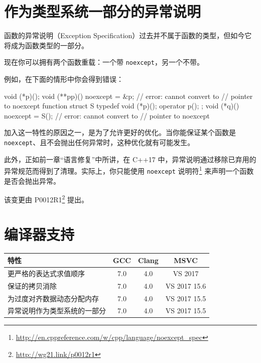 \section{作为类型系统一部分的异常说明}

函数的异常说明（Exception Specification）过去并不属于函数的类型，但如今它将成为函数类型的一部分。

现在你可以拥有两个函数重载：一个带 \texttt{noexcept}，另一个不带。

例如，在下面的情形中你会得到错误：

\begin{codebox}[cpp]
void (*p)();
void (**pp)() noexcept = &p; // error: cannot convert to
// pointer to noexcept function
struct S { typedef void (*p)(); operator p(); };
void (*q)() noexcept = S(); // error: cannot convert to
// pointer to noexcept
\end{codebox}

加入这一特性的原因之一，是为了允许更好的优化。当你能保证某个函数是 \texttt{noexcept}、且不会抛出任何异常时，这种优化就有可能发生。

此外，正如前一章“语言修复”中所讲，在 C++17 中，异常说明通过移除已弃用的异常规范而得到了清理。实际上，你只能使用 \texttt{noexcept} 说明符\footnote{\url{http://en.cppreference.com/w/cpp/language/noexcept_spec}} 来声明一个函数是否会抛出异常。

\begin{myInfoBox}
该变更由 P0012R1\footnote{\url{http://wg21.link/p0012r1}} 提出。
\end{myInfoBox}

\section{编译器支持}

\begin{table}[H]
\centering
\begin{tabularx}{\textwidth}{X c c c}
\toprule
特性 & GCC & Clang & MSVC \\
\midrule
更严格的表达式求值顺序 & 7.0 & 4.0 & VS 2017 \\
保证的拷贝消除 & 7.0 & 4.0 & VS 2017 15.6 \\
为过度对齐数据动态分配内存 & 7.0 & 4.0 & VS 2017 15.5 \\
异常说明作为类型系统的一部分 & 7.0 & 4.0 & VS 2017 15.5 \\
\bottomrule
\end{tabularx}
\end{table}
